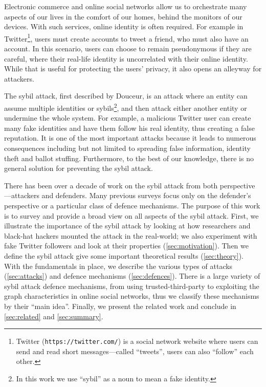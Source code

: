 Electronic commerce and online social networks allow us to orchestrate many
aspects of our lives in the comfort of our homes, behind the monitors of our
devices. With such services, online identity is often required. For example in
Twitter\footnote{Twitter (\texttt{https://twitter.com/}) is a social network website
  where users can send and read short messages---called ``tweets'', users can
  also ``follow'' each other.}, users must create accounts to tweet a friend,
who must also have an account. In this scenario, users can choose to remain
pseudonymous if they are careful, where their real-life identity is uncorrelated
with their online identity. While that is useful for protecting the users'
privacy, it also opens an alleyway for attackers.

The sybil attack, first described by Douceur\cite{douceur2002sybil}, is an
attack where an entity can assume multiple identities or sybils\footnote{In this
  work we use ``sybil'' as a noun to mean a fake identity.}, and then attack
either another entity or undermine the whole system. For example, a malicious
Twitter user can create many fake identities and have them follow his real
identity, thus creating a false reputation. It is one of the most important
attacks because it leads to numerous consequences including but not limited to
spreading false information, identity theft\cite{bilge2009all} and ballot
stuffing\cite{bhattacharjee2005avoiding}. Furthermore, to the best of our
knowledge, there is no general solution for preventing the sybil attack.

There has been over a decade of work on the sybil attack from both
perspective---attackers and defenders. Many previous surveys focus only on the
defender's perspective or a particular class of defence mechanisms. The purpose
of this work is to survey and provide a broad view on all aspects of the sybil
attack. First, we illustrate the importance of the sybil attack by looking at
how researchers and black-hat hackers mounted the attack in the real-world; we
also experiment with fake Twitter followers and look at their properties
(\autoref{sec:motivation}). Then we define the sybil attack give some important
theoretical results (\autoref{sec:theory}). With the fundamentals in place, we
describe the various types of attacks (\autoref{sec:attacks}) and defence
mechanisms (\autoref{sec:defences}). There is a large variety of sybil attack
defence mechanisms, from using trusted-third-party to exploiting the graph
characteristics in online social networks, thus we classify these mechanisms by
their ``main idea''. Finally, we present the related work and conclude in
\autoref{sec:related} and \autoref{sec:summary}.

